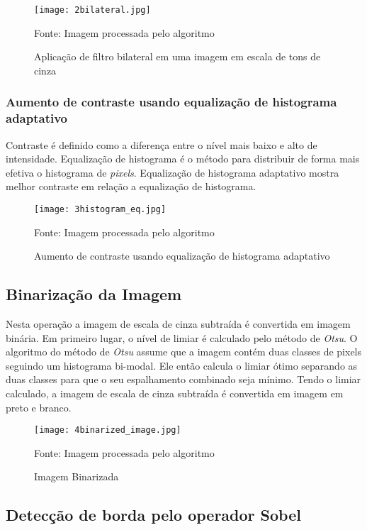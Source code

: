 \begin{figure}[H]
	\centering
	\texttt{[image: 2bilateral.jpg]}
	\caption{Aplicação de filtro bilateral em uma imagem em escala de tons de cinza}
Fonte: Imagem processada pelo algoritmo
	\label{fig:ext_filter_in_gray_scale}
\end{figure}

\subsubsection{Aumento de contraste usando equalização de histograma adaptativo}

Contraste é definido como a diferença entre o nível mais baixo e alto de
intensidade. Equalização de histograma é o método para distribuir de forma mais
efetiva o histograma de \emph{pixels}. Equalização de histograma adaptativo
mostra melhor contraste em relação a equalização de histograma.

\begin{figure}[H]
	\centering
	\texttt{[image: 3histogram\_eq.jpg]}
	\caption{Aumento de contraste usando equalização de histograma adaptativo}
Fonte: Imagem processada pelo algoritmo
	\label{fig:ext_contrast_adaptive_histogram}
\end{figure}

\subsection{Binarização da Imagem}

Nesta operação a imagem de escala de cinza subtraída é convertida em imagem
binária. Em primeiro lugar, o nível de limiar é calculado pelo método de \emph{Otsu}.
O algoritmo do método de \emph{Otsu} assume que  a imagem contém duas classes de pixels
seguindo um histograma bi-modal. Ele então calcula o limiar ótimo separando as
duas classes para que o seu espalhamento combinado seja mínimo.
Tendo o limiar calculado, a imagem de escala de cinza subtraída é convertida em
imagem em preto e branco.

\begin{figure}[H]
	\centering
	\texttt{[image: 4binarized\_image.jpg]}
	\caption{Imagem Binarizada}
Fonte: Imagem processada pelo algoritmo
	\label{fig:ext_binarized_image}
\end{figure}

\subsection{Detecção de borda pelo operador Sobel}

